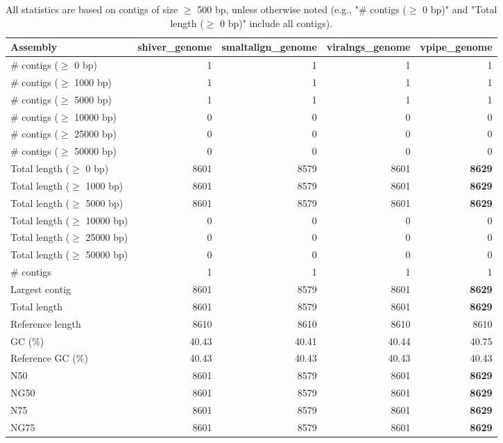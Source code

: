 \documentclass[12pt,a4paper]{article}
\begin{document}
\begin{table}[ht]
\begin{center}
\caption{All statistics are based on contigs of size $\geq$ 500 bp, unless otherwise noted (e.g., "\# contigs ($\geq$ 0 bp)" and "Total length ($\geq$ 0 bp)" include all contigs).}
\begin{tabular}{|l*{4}{|r}|}
\hline
Assembly & shiver\_genome & smaltalign\_genome & viralngs\_genome & vpipe\_genome \\ \hline
\# contigs ($\geq$ 0 bp) & 1 & 1 & 1 & 1 \\ \hline
\# contigs ($\geq$ 1000 bp) & 1 & 1 & 1 & 1 \\ \hline
\# contigs ($\geq$ 5000 bp) & 1 & 1 & 1 & 1 \\ \hline
\# contigs ($\geq$ 10000 bp) & 0 & 0 & 0 & 0 \\ \hline
\# contigs ($\geq$ 25000 bp) & 0 & 0 & 0 & 0 \\ \hline
\# contigs ($\geq$ 50000 bp) & 0 & 0 & 0 & 0 \\ \hline
Total length ($\geq$ 0 bp) & 8601 & 8579 & 8601 & {\bf 8629} \\ \hline
Total length ($\geq$ 1000 bp) & 8601 & 8579 & 8601 & {\bf 8629} \\ \hline
Total length ($\geq$ 5000 bp) & 8601 & 8579 & 8601 & {\bf 8629} \\ \hline
Total length ($\geq$ 10000 bp) & 0 & 0 & 0 & 0 \\ \hline
Total length ($\geq$ 25000 bp) & 0 & 0 & 0 & 0 \\ \hline
Total length ($\geq$ 50000 bp) & 0 & 0 & 0 & 0 \\ \hline
\# contigs & 1 & 1 & 1 & 1 \\ \hline
Largest contig & 8601 & 8579 & 8601 & {\bf 8629} \\ \hline
Total length & 8601 & 8579 & 8601 & {\bf 8629} \\ \hline
Reference length & 8610 & 8610 & 8610 & 8610 \\ \hline
GC (\%) & 40.43 & 40.41 & 40.44 & 40.75 \\ \hline
Reference GC (\%) & 40.43 & 40.43 & 40.43 & 40.43 \\ \hline
N50 & 8601 & 8579 & 8601 & {\bf 8629} \\ \hline
NG50 & 8601 & 8579 & 8601 & {\bf 8629} \\ \hline
N75 & 8601 & 8579 & 8601 & {\bf 8629} \\ \hline
NG75 & 8601 & 8579 & 8601 & {\bf 8629} \\ \hline

\end{tabular}
\end{center}
\end{table}
\end{document}
